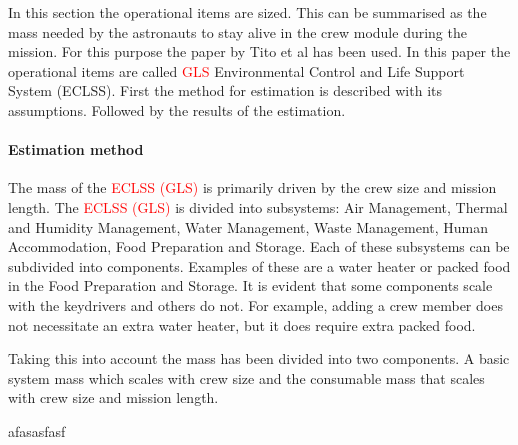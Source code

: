 In this section the operational items are sized. This can be summarised as the mass needed by the astronauts to stay alive in the crew module during the mission. For this purpose the paper by Tito et al \cite{tito2013} has been used. In this paper the operational items are called \textcolor{red}{GLS} Environmental Control and Life Support System (ECLSS). First the method for estimation is described with its assumptions. Followed by the results of the estimation.

\paragraph{Estimation method}
\label{par:operationalest}
The mass of the \textcolor{red}{ECLSS (GLS)} is primarily driven by the crew size and mission length. The \textcolor{red}{ECLSS (GLS)} is divided into subsystems: Air Management, Thermal and Humidity Management, Water Management, Waste Management, Human Accommodation, Food Preparation and Storage. Each of these subsystems can be subdivided into components. Examples of these are a water heater or packed food in the Food Preparation and Storage. It is evident that some components scale with the keydrivers and others do not. For example, adding a crew member does not necessitate an extra water heater, but it does require extra packed food. 


Taking this into account the mass has been divided into two components. A basic system mass which scales with crew size and the consumable mass that scales with crew size and mission length.





afasasfasf
